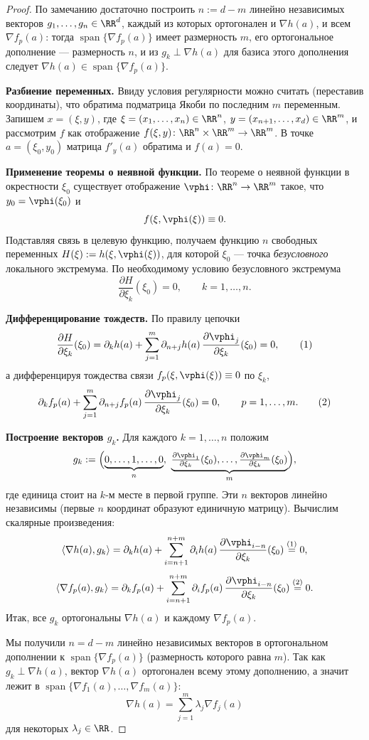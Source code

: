 \begin{proof}
	По замечанию достаточно построить $n:=d-m$ линейно независимых векторов
	$g_1,\dots,g_n\in\RR^d$, каждый из которых ортогонален и $\nabla h(a)$, и всем
	$\nabla f_p(a)$: тогда $\operatorname{span}\{\nabla f_p(a)\}$ имеет размерность $m$,
	его ортогональное дополнение --- размерность $n$, и из $g_k\perp\nabla h(a)$ для
	базиса этого дополнения следует $\nabla h(a)\in\operatorname{span}\{\nabla f_p(a)\}$.

	\textbf{Разбиение переменных.} Ввиду условия регулярности можно считать (переставив
	координаты), что обратима подматрица Якоби по последним $m$ переменным. Запишем
	$x=(\xi,y)$, где $\xi=(x_1,\dots,x_n)\in\RR^n$, $y=(x_{n+1},\dots,x_d)\in\RR^m$, и
	рассмотрим $f$ как отображение $f(\xi,y)\colon\RR^n\times\RR^m\to\RR^m$. В точке
	$a=(\xi_0,y_0)$ матрица $f'_y(a)$ обратима и $f(a)=0$.

	\textbf{Применение теоремы о неявной функции.} По теореме о неявной функции в
	окрестности $\xi_0$ существует отображение $\vphi\colon\RR^n\to\RR^m$ такое, что
	$y_0=\vphi(\xi_0)$ и
	\[
	f(\xi,\vphi(\xi))\equiv 0.
	\]
	Подставляя связь в целевую функцию, получаем функцию $n$ свободных переменных
	$H(\xi):=h(\xi,\vphi(\xi))$, для которой $\xi_0$ --- точка \emph{безусловного}
	локального экстремума. По необходимому условию безусловного экстремума
	\[
	\frac{\partial H}{\partial\xi_k}(\xi_0)=0,\qquad k=1,\dots,n.
	\]

	\textbf{Дифференцирование тождеств.} По правилу цепочки
	\[
	\frac{\partial H}{\partial\xi_k}(\xi_0)
	=\partial_k h(a)+\sum_{j=1}^{m}\partial_{n+j}h(a)\,\frac{\partial\vphi_j}{\partial\xi_k}(\xi_0)=0,
	\tag{1}
	\]
	а дифференцируя тождества связи $f_p(\xi,\vphi(\xi))\equiv 0$ по $\xi_k$,
	\[
	\partial_k f_p(a)+\sum_{j=1}^{m}\partial_{n+j}f_p(a)\,\frac{\partial\vphi_j}{\partial\xi_k}(\xi_0)=0,
	\qquad p=1,\dots,m.
	\tag{2}
	\]

	\textbf{Построение векторов $g_k$.} Для каждого $k=1,\dots,n$ положим
	\[
	g_k:=\Bigl(\underbrace{0,\dots,1,\dots,0}_{n},\ \underbrace{\tfrac{\partial\vphi_1}{\partial\xi_k}(\xi_0),\dots,\tfrac{\partial\vphi_m}{\partial\xi_k}(\xi_0)}_{m}\Bigr),
	\]
	где единица стоит на $k$-м месте в первой группе. Эти $n$ векторов линейно
	независимы (первые $n$ координат образуют единичную матрицу). Вычислим скалярные
	произведения:
	\[
	\langle\nabla h(a),g_k\rangle
	=\partial_k h(a)+\sum_{i=n+1}^{n+m}\partial_i h(a)\,\frac{\partial\vphi_{i-n}}{\partial\xi_k}(\xi_0)
	\overset{(1)}{=}0,
	\]
	\[
	\langle\nabla f_p(a),g_k\rangle
	=\partial_k f_p(a)+\sum_{i=n+1}^{n+m}\partial_i f_p(a)\,\frac{\partial\vphi_{i-n}}{\partial\xi_k}(\xi_0)
	\overset{(2)}{=}0.
	\]
	Итак, все $g_k$ ортогональны $\nabla h(a)$ и каждому $\nabla f_p(a)$.

	Мы получили $n=d-m$ линейно независимых векторов в ортогональном дополнении к
	$\operatorname{span}\{\nabla f_p(a)\}$ (размерность которого равна $m$). Так как
	$g_k\perp\nabla h(a)$, вектор $\nabla h(a)$ ортогонален всему этому дополнению, а
	значит лежит в $\operatorname{span}\{\nabla f_1(a),\dots,\nabla f_m(a)\}$:
	\[
	\nabla h(a)=\sum_{j=1}^{m}\lambda_j\nabla f_j(a)
	\]
	для некоторых $\lambda_j\in\RR$.
\end{proof}

